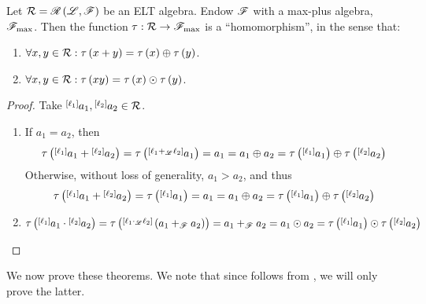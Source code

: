 \begin{lem}\label{lem:hom-elt-maxplus}
Let $\R=\ELT{\F}{\L}$ be an ELT algebra. Endow $\F$ with a max-plus algebra, $\F_{\max}$. Then the function $\t:\R\to\F_{\max}$ is a ``homomorphism'', in the sense that:
\begin{enumerate}
\item $\forall x,y\in\R:\t\left(x+y\right)=\t\left(x\right)\oplus\t\left(y\right)$.
\item $\forall x,y\in\R:\t\left(xy\right)=\t\left(x\right)\odot\t\left(y\right)$.
\end{enumerate}
\end{lem}
\begin{proof}
Take $\layer{a_{1}}{\ell_{1}},\layer{a_{2}}{\ell_{2}}\in\R$.
\begin{enumerate}
\item If $a_1=a_2$, then
$$\t\left(\layer{a_{1}}{\ell_{1}}+\layer{a_{2}}{\ell_{2}}\right)=\t\left(\layer{a_1}{\ell_1+_\L\ell_2}\right)=a_1=a_1\oplus a_2=\t\left(\layer{a_{1}}{\ell_{1}}\right)\oplus\t\left(\layer{a_{2}}{\ell_{2}}\right)$$
Otherwise, without loss of generality, $a_1>a_2$, and thus
$$\t\left(\layer{a_{1}}{\ell_{1}}+\layer{a_{2}}{\ell_{2}}\right)=\t\left(\layer{a_1}{\ell_1}\right)=a_1=a_1\oplus a_2=\t\left(\layer{a_{1}}{\ell_{1}}\right)\oplus\t\left(\layer{a_{2}}{\ell_{2}}\right)$$
\item $\t\left(\layer{a_{1}}{\ell_{1}}\cdot\layer{a_{2}}{\ell_{2}}\right)=\t\left(\layer{\left(a_{1}+_\F a_{2}\right)}{\ell_{1}\cdot_\L\ell_{2}}\right)=a_1+_\F a_2=a_1\odot a_2=\t\left(\layer{a_{1}}{\ell_{1}}\right)\odot\t\left(\layer{a_{2}}{\ell_{2}}\right)$
\end{enumerate}
\end{proof}

We now prove these theorems. We note that since  follows from , we will only prove the latter.\\


